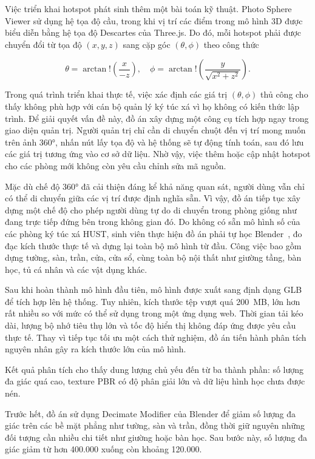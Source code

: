\documentclass[../DoAn.tex]{subfiles}
\begin{document}
Việc triển khai hotspot phát sinh thêm một bài toán kỹ thuật. Photo Sphere
Viewer sử dụng hệ tọa độ cầu, trong khi vị trí các điểm trong mô hình 3D được
biểu diễn bằng hệ tọa độ Descartes của Three.js. Do đó, mỗi hotspot phải được
chuyển đổi từ tọa độ $(x,y,z)$ sang cặp góc $(\theta,\phi)$ theo công thức

\begin{equation}
\theta = \arctan!\left(\frac{x}{-z}\right), \quad
\phi = \arctan!\left(\frac{y}{\sqrt{x^2+z^2}}\right).
\label{eq:cart_to_sphere}
\end{equation}

Trong quá trình triển khai thực tế, việc xác định các giá trị
$(\theta,\phi)$ thủ công cho thấy không phù hợp với cán bộ quản lý ký túc xá vì họ không
có kiến thức lập trình. Để giải quyết vấn đề này, đồ án xây dựng một công cụ
tích hợp ngay trong giao diện quản trị. Người quản trị chỉ cần di chuyển chuột
đến vị trí mong muốn trên ảnh 360°, nhấn nút lấy tọa độ và hệ thống sẽ tự động
tính toán, sau đó lưu các giá trị tương ứng vào cơ sở dữ liệu. Nhờ vậy, việc
thêm hoặc cập nhật hotspot cho các phòng mới không còn yêu cầu chỉnh sửa mã
nguồn.

Mặc dù chế độ 360° đã cải thiện đáng kể khả năng quan sát, người dùng vẫn chỉ
có thể di chuyển giữa các vị trí được định nghĩa sẵn. Vì vậy, đồ án tiếp tục
xây dựng một chế độ cho phép người dùng tự do di chuyển trong phòng giống như
đang trực tiếp đứng bên trong không gian đó. Do không có sẵn mô hình số của
các phòng ký túc xá HUST, sinh viên thực hiện đồ án phải tự học Blender~\cite{blender2024}, đo đạc
kích thước thực tế và dựng lại toàn bộ mô hình từ đầu. Công việc bao gồm dựng
tường, sàn, trần, cửa, cửa sổ, cùng toàn bộ nội thất như giường tầng, bàn học,
tủ cá nhân và các vật dụng khác.

Sau khi hoàn thành mô hình đầu tiên, mô hình được xuất sang định dạng GLB để tích hợp
lên hệ thống. Tuy nhiên, kích thước tệp vượt quá 200~MB, lớn hơn rất nhiều so
với mức có thể sử dụng trong một ứng dụng web. Thời gian tải kéo dài, lượng bộ
nhớ tiêu thụ lớn và tốc độ hiển thị không đáp ứng được yêu cầu thực tế. Thay
vì tiếp tục tối ưu một cách thử nghiệm, đồ án tiến hành phân tích nguyên nhân gây
ra kích thước lớn của mô hình.

Kết quả phân tích cho thấy dung lượng chủ yếu đến từ ba thành phần: số lượng
đa giác quá cao, texture PBR có độ phân giải lớn và dữ liệu hình học chưa được
nén.

Trước hết, đồ án sử dụng Decimate Modifier của Blender để giảm số lượng đa giác
trên các bề mặt phẳng như tường, sàn và trần, đồng thời giữ nguyên những đối
tượng cần nhiều chi tiết như giường hoặc bàn học. Sau bước này, số lượng đa
giác giảm từ hơn 400.000 xuống còn khoảng 120.000.
\end{document}
